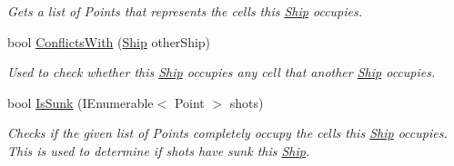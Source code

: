 \begin{DoxyCompactItemize}
\begin{DoxyCompactList}\small\item\em Gets a list of Points that represents the cells this \hyperlink{class_m_b_c_1_1_core_1_1_ship}{Ship} occupies.\end{DoxyCompactList}\item 
bool \hyperlink{class_m_b_c_1_1_core_1_1_ship_ac3f8bbb63b27d60b4ea3581141cdc5f9}{Conflicts\-With} (\hyperlink{class_m_b_c_1_1_core_1_1_ship}{Ship} other\-Ship)
\begin{DoxyCompactList}\small\item\em Used to check whether this \hyperlink{class_m_b_c_1_1_core_1_1_ship}{Ship} occupies any cell that another \hyperlink{class_m_b_c_1_1_core_1_1_ship}{Ship} occupies.\end{DoxyCompactList}\item 
bool \hyperlink{class_m_b_c_1_1_core_1_1_ship_aebf36ec312c5d6ef5c14c095444ee769}{Is\-Sunk} (I\-Enumerable$<$ Point $>$ shots)
\begin{DoxyCompactList}\small\item\em Checks if the given list of Points completely occupy the cells this \hyperlink{class_m_b_c_1_1_core_1_1_ship}{Ship} occupies. This is used to determine if shots have sunk this \hyperlink{class_m_b_c_1_1_core_1_1_ship}{Ship}.\end{DoxyCompactList}\end{DoxyCompactItemize}
